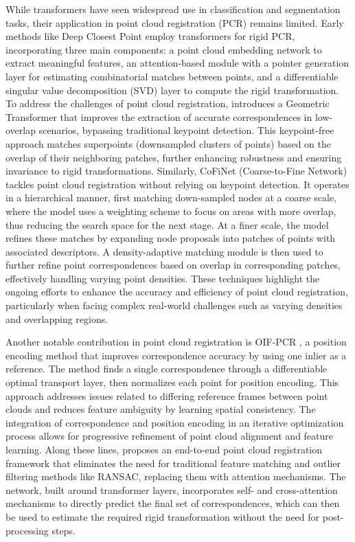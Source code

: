 While transformers have seen widespread use in classification and segmentation tasks, their application in point cloud registration (PCR) remains limited. Early methods like Deep Closest Point \cite{wang2019deep} employ transformers for rigid PCR, incorporating three main components: a point cloud embedding network to extract meaningful features, an attention-based module with a pointer generation layer for estimating combinatorial matches between points, and a differentiable singular value decomposition (SVD) layer to compute the rigid transformation. To address the challenges of point cloud registration, \cite{qin2022geometric} introduces a Geometric Transformer that improves the extraction of accurate correspondences in low-overlap scenarios, bypassing traditional keypoint detection. This keypoint-free approach matches superpoints (downsampled clusters of points) based on the overlap of their neighboring patches, further enhancing robustness and ensuring invariance to rigid transformations. Similarly, CoFiNet (Coarse-to-Fine Network) \cite{yu2021cofinet} tackles point cloud registration without relying on keypoint detection. It operates in a hierarchical manner, first matching down-sampled nodes at a coarse scale, where the model uses a weighting scheme to focus on areas with more overlap, thus reducing the search space for the next stage. At a finer scale, the model refines these matches by expanding node proposals into patches of points with associated descriptors. A density-adaptive matching module is then used to further refine point correspondences based on overlap in corresponding patches, effectively handling varying point densities. These techniques highlight the ongoing efforts to enhance the accuracy and efficiency of point cloud registration, particularly when facing complex real-world challenges such as varying densities and overlapping regions.

Another notable contribution in point cloud registration is OIF-PCR \cite{yang2022one}, a position encoding method that improves correspondence accuracy by using one inlier as a reference. The method finds a single correspondence through a differentiable optimal transport layer, then normalizes each point for position encoding. This approach addresses issues related to differing reference frames between point clouds and reduces feature ambiguity by learning spatial consistency. The integration of correspondence and position encoding in an iterative optimization process allows for progressive refinement of point cloud alignment and feature learning. Along these lines, \cite{yew2022regtr} proposes an end-to-end point cloud registration framework that eliminates the need for traditional feature matching and outlier filtering methods like RANSAC, replacing them with attention mechanisms. The network, built around transformer layers, incorporates self- and cross-attention mechanisms to directly predict the final set of correspondences, which can then be used to estimate the required rigid transformation without the need for post-processing steps.


